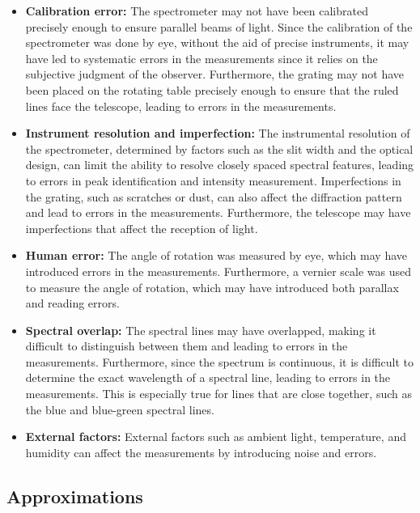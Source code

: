\documentclass[10pt]{article}
\begin{document}
\begin{itemize}
  \item \textbf{Calibration error:} The spectrometer may not have been calibrated precisely enough to ensure parallel beams of light. Since the calibration of the spectrometer was done by eye, without the aid of precise instruments, it may have led to systematic errors in the measurements since it relies on the subjective judgment of the observer. Furthermore, the grating may not have been placed on the rotating table precisely enough to ensure that the ruled lines face the telescope, leading to errors in the measurements.
  
  \item \textbf{Instrument resolution and imperfection:} The instrumental resolution of the spectrometer, determined by factors such as the slit width and the optical design, can limit the ability to resolve closely spaced spectral features, leading to errors in peak identification and intensity measurement. Imperfections in the grating, such as scratches or dust, can also affect the diffraction pattern and lead to errors in the measurements. Furthermore, the telescope may have imperfections that affect the reception of light.
  
  \item \textbf{Human error:} The angle of rotation was measured by eye, which may have introduced errors in the measurements. Furthermore, a vernier scale was used to measure the angle of rotation, which may have introduced both parallax and reading errors. 
  
  \item \textbf{Spectral overlap:} The spectral lines may have overlapped, making it difficult to distinguish between them and leading to errors in the measurements. Furthermore, since the spectrum is continuous, it is difficult to determine the exact wavelength of a spectral line, leading to errors in the measurements. This is especially true for lines that are close together, such as the blue and blue-green spectral lines.
  
  \item \textbf{External factors:} External factors such as ambient light, temperature, and humidity can affect the measurements by introducing noise and errors. 
\end{itemize}

\subsection*{Approximations}
\end{document}
